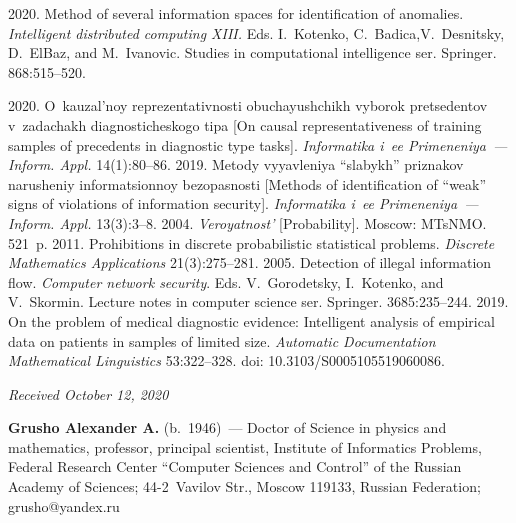 \begin{multicols}{2}
{{\begin{thebibliography}{99}
 2020. Method of several information spaces for 
identification of anomalies. \textit{Intelligent distributed computing XIII.} Eds. I.~Kotenko, 
C.~Badica,V.~Desnitsky, D.~ElBaz, and M.~Ivanovic.
Studies in computational intelligence ser. Springer. 868:515--520.

 2020. O~kauzal'noy reprezentativnosti 
obuchayushchikh vyborok pretsedentov v~zadachakh diagnosticheskogo tipa [On causal representativeness 
of training samples of precedents in diagnostic type tasks]. \textit{Informatika i~ee Primeneniya~--- 
Inform. Appl.} 14(1):80--86.
 2019. Metody vyyavleniya ``slabykh'' 
priznakov narusheniy informatsionnoy 
bezopas\-nosti [Methods of identification of ``weak'' signs of violations of information security]. 
\textit{Informatika i~ee Primeneniya~--- Inform. Appl.} 13(3):3--8.
 2004. \textit{Veroyatnost'} [Probability]. Moscow: MTsNMO. 521~p.
 2011. Prohibitions in discrete probabilistic statistical problems. 
\textit{Discrete Mathematics Applications}  
21(3):275--281.
 2005. Detection of illegal information flow. 
\textit{Computer network security}. Eds. V.~Gorodetsky, I.~Kotenko, and V.~Skormin. 
Lecture notes in computer science ser. Springer. 3685:235--244.
 2019. On the problem of medical diagnostic evidence: Intelligent 
analysis of empirical data on patients in samples of limited size. \textit{Automatic Documentation Mathematical
Linguistics} 53:322--328. doi: 10.3103/S0005105519060086.
\end{thebibliography}

 }
 }

\end{multicols}

\vspace*{-3pt}

\hfill{\small\textit{Received October 12, 2020}}



\Contr

\noindent
\textbf{Grusho Alexander A.} (b.\ 1946)~--- Doctor of Science in physics and mathematics, professor, 
principal scientist, Institute of Informatics Problems, Federal Research Center ``Computer Sciences and 
Control'' of the Russian Academy of Sciences; 44-2~Vavilov Str., Moscow 119133, Russian Federation;  
\mbox{grusho@yandex.ru}

